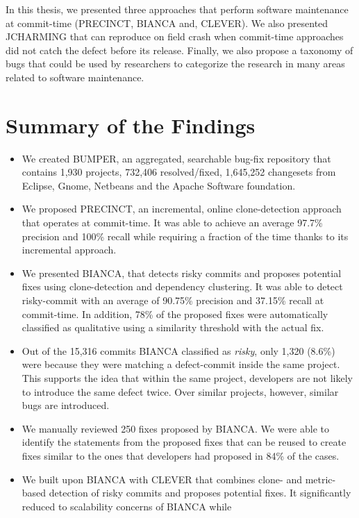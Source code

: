 \documentclass[12pt]{report}
\begin{document}
In this thesis, we presented three approaches that perform software
maintenance at commit-time (PRECINCT, BIANCA and, CLEVER). We also
presented JCHARMING that can reproduce on field crash when commit-time
approaches did not catch the defect before its release. Finally, we also
propose a taxonomy of bugs that could be used by researchers to
categorize the research in many areas related to software maintenance.

\section{Summary of the Findings}\label{summary-of-the-findings}

\begin{itemize}
\item
  We created BUMPER, an aggregated, searchable bug-fix repository that
  contains 1,930 projects, 732,406 resolved/fixed, 1,645,252 changesets
  from Eclipse, Gnome, Netbeans and the Apache Software foundation.
\item
  We proposed PRECINCT, an incremental, online clone-detection approach
  that operates at commit-time. It was able to achieve an average 97.7\%
  precision and 100\% recall while requiring a fraction of the time
  thanks to its incremental approach.
\item
  We presented BIANCA, that detects risky commits and proposes potential
  fixes using clone-detection and dependency clustering. It was able to
  detect risky-commit with an average of 90.75\% precision and 37.15\%
  recall at commit-time. In addition, 78\% of the proposed fixes were
  automatically classified as qualitative using a similarity threshold
  with the actual fix.
\item
  Out of the 15,316 commits BIANCA classified as \emph{risky}, only
  1,320 (8.6\%) were because they were matching a defect-commit inside
  the same project. This supports the idea that within the same project,
  developers are not likely to introduce the same defect twice. Over
  similar projects, however, similar bugs are introduced.
\item
  We manually reviewed 250 fixes proposed by BIANCA. We were able to
  identify the statements from the proposed fixes that can be reused to
  create fixes similar to the ones that developers had proposed in 84\%
  of the cases.
\item
  We built upon BIANCA with CLEVER that combines clone- and metric-based
  detection of risky commits and proposes potential fixes. It
  significantly reduced to scalability concerns of BIANCA while

\end{itemize}
\end{document}
